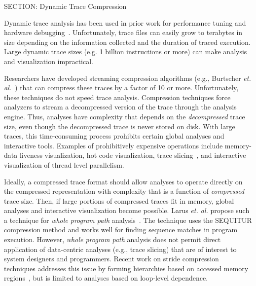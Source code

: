 {SECTION: Dynamic Trace Compression


Dynamic trace analysis has been used in prior work for performance tuning and hardware debugging~\cite{wu:94:micro}. Unfortunately, trace files can easily grow to terabytes in size depending on the information collected and the duration of traced execution.  Large dynamic trace sizes (e.g. 1 billion instructions or more) can make analysis and visualization impractical.

Researchers have developed streaming compression algorithms (e.g., Burtscher \textit{et. al.}~\cite{burtscher:05:cgo}) that can compress these traces by a factor of 10 or more.  Unfortunately, these techniques do not speed trace analysis.  Compression techniques force analyzers to stream a decompressed version of the trace through the analysis engine.  Thus, analyses have complexity that depends on the \textit{decompressed} trace size, even though the decompressed trace is never stored on disk.  With large traces, this time-consuming process prohibits certain global analyses and interactive tools. Examples of prohibitively expensive operations include memory-data liveness visualization, hot code visualization, trace slicing~\cite{zhang:04:icse}, and interactive visualization of thread level parallelism.

Ideally, a compressed trace format should allow analyses to operate directly on the compressed representation with complexity that is a function of \textit{compressed} trace size.  Then, if large portions of compressed traces fit in memory, global analyses and interactive visualization become possible.  Larus \textit{et. al.} propose such a technique for \textit{whole program path} analysis~\cite{larus:99:pldi}.  The technique uses the SEQUITUR compression method and works well for finding sequence matches in program execution.  However, \textit{whole program path} analysis does not permit direct application of data-centric analyses (e.g., trace slicing) that are of interest to system designers and programmers. Recent work on stride compression techniques addresses this issue by forming hierarchies based on accessed memory regions~\cite{minjang:10:micro}, but is limited to analyses based on loop-level dependence.

}
